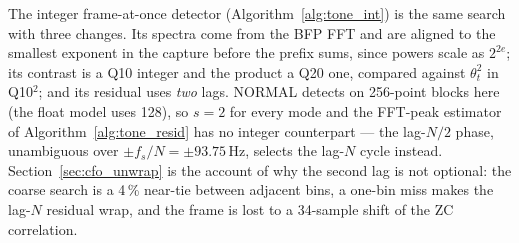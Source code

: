 The integer frame-at-once detector (Algorithm~\ref{alg:tone_int}) is
the same search with three changes.  Its spectra come from the BFP FFT
and are aligned to the smallest exponent in the capture before the
prefix sums, since powers scale as $2^{2e}$; its contrast is a Q10
integer and the product a Q20 one, compared against $\theta_t^2$ in
Q10$^2$; and its residual uses \emph{two} lags.  NORMAL detects on
256-point blocks here (the float model uses 128), so $s = 2$ for every
mode and the FFT-peak estimator of Algorithm~\ref{alg:tone_resid} has
no integer counterpart --- the lag-$N/2$ phase, unambiguous over
$\pm f_s/N = \pm 93.75$\,Hz, selects the lag-$N$ cycle instead.
Section~\ref{sec:cfo_unwrap} is the account of why the second lag is
not optional: the coarse search is a 4\,\% near-tie between adjacent
bins, a one-bin miss makes the lag-$N$ residual wrap, and the frame is
lost to a 34-sample shift of the ZC correlation.

